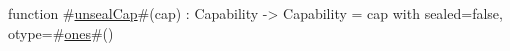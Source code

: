 function #\hyperref[sailMIPSzunsealCap]{unsealCap}#(cap) : Capability -> Capability =
    {cap with sealed=false, otype=#\hyperref[sailMIPSzones]{ones}#()}
